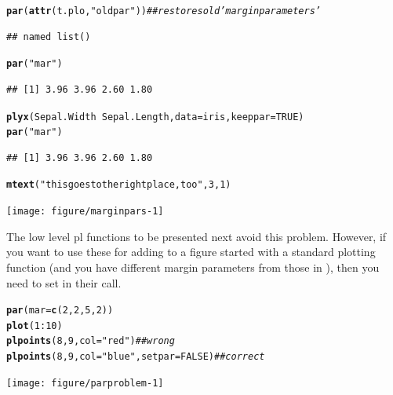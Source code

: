 \documentclass[11pt]{article}\usepackage[]{graphicx}\usepackage[]{color}
\makeatletter
\newcommand{\hlnum}[1]{\textcolor[rgb]{0.686,0.059,0.569}{#1}}%
\newcommand{\hlstr}[1]{\textcolor[rgb]{0.192,0.494,0.8}{#1}}%
\newcommand{\hlcom}[1]{\textcolor[rgb]{0.678,0.584,0.686}{\textit{#1}}}%
\newcommand{\hlopt}[1]{\textcolor[rgb]{0,0,0}{#1}}%
\newcommand{\hlstd}[1]{\textcolor[rgb]{0.345,0.345,0.345}{#1}}%
\newcommand{\hlkwc}[1]{\textcolor[rgb]{0.333,0.667,0.333}{#1}}%
\newcommand{\hlkwd}[1]{\textcolor[rgb]{0.737,0.353,0.396}{\textbf{#1}}}%
\newenvironment{kframe}{%
 \def\at@end@of@kframe{}%
 \ifinner\ifhmode%
  \def\at@end@of@kframe{\end{minipage}}%
  \begin{minipage}{\columnwidth}%
 \fi\fi%
 \def\FrameCommand##1{\hskip\@totalleftmargin \hskip-\fboxsep
 \colorbox{shadecolor}{##1}\hskip-\fboxsep
     \hskip-\linewidth \hskip-\@totalleftmargin \hskip\columnwidth}%
 \MakeFramed {\advance\hsize-\width
   \@totalleftmargin\z@ \linewidth\hsize
   \@setminipage}}%
 {\par\unskip\endMakeFramed%
 \at@end@of@kframe}
\newenvironment{knitrout}{}{} %
\makeatother
\begin{document}
\begin{knitrout}
\begin{kframe}
\begin{alltt}
\hlkwd{par}\hlstd{(}\hlkwd{attr}\hlstd{(t.plo,} \hlstr{"oldpar"}\hlstd{))}  \hlcom{## restores old 'margin parameters' }
\end{alltt}
\begin{verbatim}
## named list()
\end{verbatim}
\begin{alltt}
\hlkwd{par}\hlstd{(}\hlstr{"mar"}\hlstd{)}
\end{alltt}
\begin{verbatim}
## [1] 3.96 3.96 2.60 1.80
\end{verbatim}
\begin{alltt}
\hlkwd{plyx}\hlstd{(Sepal.Width}\hlopt{~}\hlstd{Sepal.Length,} \hlkwc{data}\hlstd{=iris,} \hlkwc{keeppar}\hlstd{=}\hlnum{TRUE}\hlstd{)}
\hlkwd{par}\hlstd{(}\hlstr{"mar"}\hlstd{)}
\end{alltt}
\begin{verbatim}
## [1] 3.96 3.96 2.60 1.80
\end{verbatim}
\begin{alltt}
\hlkwd{mtext}\hlstd{(}\hlstr{"this goes to the right place, too"}\hlstd{,}\hlnum{3}\hlstd{,}\hlnum{1}\hlstd{)}
\end{alltt}
\end{kframe}
\texttt{[image: figure/marginpars-1]} 
\end{knitrout}

The low level pl functions to be presented next avoid this problem.
However, if you want to use these for adding to a figure started with
a standard plotting function (and you have different margin parameters
from those in ), then you need to set 
in their call.
\begin{knitrout}
\color{fgcolor}\begin{kframe}
\begin{alltt}
\hlkwd{par}\hlstd{(}\hlkwc{mar}\hlstd{=}\hlkwd{c}\hlstd{(}\hlnum{2}\hlstd{,}\hlnum{2}\hlstd{,}\hlnum{5}\hlstd{,}\hlnum{2}\hlstd{))}
\hlkwd{plot}\hlstd{(}\hlnum{1}\hlopt{:}\hlnum{10}\hlstd{)}
\hlkwd{plpoints}\hlstd{(}\hlnum{8}\hlstd{,}\hlnum{9}\hlstd{,} \hlkwc{col}\hlstd{=}\hlstr{"red"}\hlstd{)} \hlcom{## wrong}
\hlkwd{plpoints}\hlstd{(}\hlnum{8}\hlstd{,}\hlnum{9}\hlstd{,} \hlkwc{col}\hlstd{=}\hlstr{"blue"}\hlstd{,} \hlkwc{setpar}\hlstd{=}\hlnum{FALSE}\hlstd{)} \hlcom{## correct}
\end{alltt}
\end{kframe}
\texttt{[image: figure/parproblem-1]} 
\end{knitrout}
\end{document}
